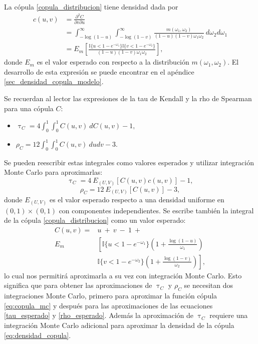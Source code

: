 \documentclass[11pt,a4paper]{article}
\begin{document}
La cópula \eqref{copula_distribucion} tiene densidad dada por
\begin{align}
c(u, v) &= \frac{\partial^2C}{\partial v \partial u}\nonumber\\
&= \int_{-\log (1-u)}^\infty \int_{-\log (1-v)}^\infty \frac{m(\omega_1, \omega_2)}{(1-u)(1-v)\omega_1\omega_2} \ d\omega_2 d\omega_1 \nonumber\\
&= E_{m} \left[\frac{\mathbb{I}\lbrace u < 1-e^{-\omega_1}\rbrace \mathbb{I}\lbrace v < 1-e^{-\omega_2} \rbrace}{(1-u)(1-v)\omega_1\omega_2}\right],
\label{eq:densidad_copula}
\end{align}
donde $E_m$ es el valor esperado con respecto a la distribución $m(\omega_1, \omega_2)$. El desarrollo de esta expresión se puede encontrar en el apéndice \ref{sec_densidad_copula_modelo}.

Se recuerdan al lector las expresiones de la tau de Kendall y la rho de Spearman para una cópula $C$:
\begin{itemize}
\item $\uptau_{C} = 4\int_{0}^1\int_{0}^1C(u, v) \ dC(u, v) - 1,$
\item $\rho_{C} = 12\int_0^1 \int_0^1 C(u, v) \ dudv-3.$
\end{itemize}
Se pueden reescribir estas integrales como valores esperados y utilizar integración Monte Carlo para aproximarlas:
\begin{equation} \label{tau_esperado}
\uptau_{C} = 4 \ E_{(U, V)}\left[C(u, v) c(u, v)\right] -1,
\end{equation}
\begin{equation} \label{rho_esperado}
\rho_{C} = 12 \ E_{(U, V)}\left[C(u, v)\right] -3,
\end{equation}
donde $E_{(U, V)}$ es el valor esperado respecto a una densidad uniforme en \newline $(0, 1)\times (0, 1)$ con componentes independientes. Se escribe también la integral de la cópula \eqref{copula_distribucion} como un valor esperado:
\begin{align}
C(u, v) = &u \ + \ v \ - \ 1 \ +\nonumber\\
E_{m} & \left[\mathbb{I}\lbrace u < 1-e^{-\omega_1}\rbrace\left(1 + \frac{\log (1-u)}{\omega_1}\right) \right.\nonumber\\
& \left. \mathbb{I}\lbrace v < 1-e^{-\omega_2}\rbrace\left(1 + \frac{\log (1-v)}{\omega_2}\right)\right], \label{eq:copula_mc}
\end{align}
lo cual nos permitirá aproximarla a su vez con integración Monte Carlo. Esto significa que para obtener las aproximaciones de $\uptau_C$ y $\rho_C$ se necesitan dos integraciones Monte Carlo, primero para aproximar la función cópula \eqref{eq:copula_mc} y después para las aproximaciones de las ecuaciones \eqref{tau_esperado} y \eqref{rho_esperado}. Además la aproximación de $\uptau_C$ requiere una integración Monte Carlo adicional para aproximar la densidad de la cópula \eqref{eq:densidad_copula}.
\end{document}
